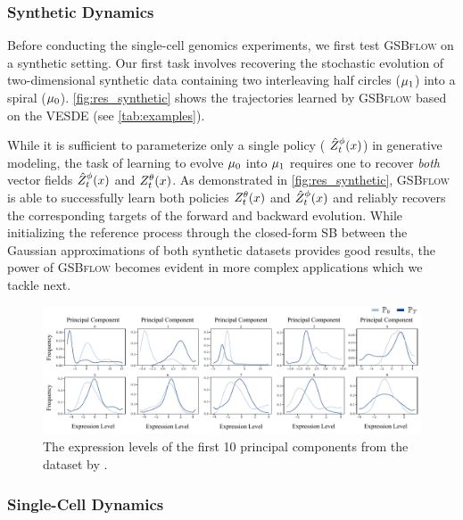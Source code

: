 \subsubsection{Synthetic Dynamics} 
\label{sec:gsbflow_synthetic}

Before conducting the single-cell genomics experiments, we first test \textsc{GSBflow} on a synthetic setting. 
Our first task involves recovering the stochastic evolution of two-dimensional synthetic data containing two interleaving half circles ($\mu_1$) into a spiral ($\mu_0$). 
\cref{fig:res_synthetic} shows the trajectories learned by \textsc{GSBflow} based on the \acrshort{VESDE} (see \cref{tab:examples}). 

While it is sufficient to parameterize only a single policy ({\color{blue} $\SBb$}) in generative modeling, the task of learning to evolve $\mu_0$ into $\mu_1$ requires one to recover \emph{both} vector fields {\color{blue} $\SBb$} and {\color{pink} $\SBf$}.
As demonstrated in \cref{fig:res_synthetic}, \textsc{GSBflow} is able to successfully learn both policies {\color{pink} $\SBf$} and {\color{blue} $\SBb$} and reliably recovers the corresponding targets of the forward and backward evolution. While initializing the reference process through the closed-form SB between the Gaussian approximations of both synthetic datasets provides good results, the power of \textsc{GSBflow} becomes evident in more complex applications which we tackle next.

\begin{figure}
     \centering
         \centering
         \includegraphics[width=\textwidth]{figures/fig_marginals_schiebinger_pcs_cropped.pdf}
         \caption{The expression levels of the first 10 principal components from the dataset by \citet{schiebinger2019optimal}.}
\label{fig:gaussianMain}
\end{figure}

\subsubsection{Single-Cell Dynamics}
\label{sec:gsbflow_cell}

